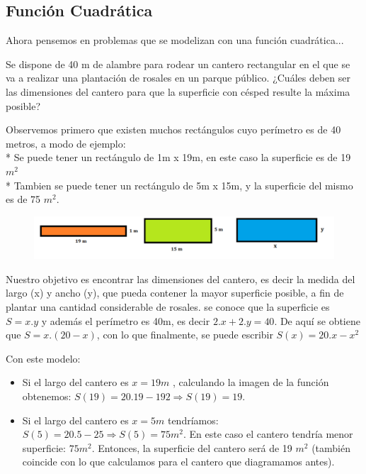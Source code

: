 \documentclass[a4paper,10pt,BCOR10mm,oneside,headsepline]{scrbook}
\begin{document}













\subsection{Función Cuadrática}

Ahora pensemos en problemas que se modelizan con una función cuadrática...

Se dispone de 40 m de alambre para rodear un cantero rectangular en el que se va a realizar una plantación de rosales en un parque público. ¿Cuáles deben ser las dimensiones del cantero para que la superficie con césped resulte la máxima posible?

Observemos primero que existen muchos rectángulos cuyo perímetro es de 40 metros, a modo de ejemplo:\\
* Se puede tener un rectángulo de 1m x 19m, en este caso la superficie es de 19 $m^{2}$\\
* Tambien se puede tener un rectángulo de 5m x 15m, y la superficie del mismo es de 75 $m^{2}$.

\begin{figure}[h!]
\centering
	\includegraphics[width=0.90\linewidth]{rectangulos.png}
\end{figure}

Nuestro objetivo es encontrar las dimensiones del cantero, es decir la medida del largo (x) y ancho (y), que pueda contener la mayor superficie posible, a fin de plantar una cantidad considerable de rosales.
se conoce que la superficie es $S = x.y$ y además el perímetro es 40m, es decir $2.x + 2.y=40 $. De aquí se obtiene que $S= x.(20-x)$, con lo que finalmente, se puede escribir $S(x) = 20.x-x^{2}$

Con este modelo: 
\begin{itemize}
	\item Si el largo del cantero es $x = 19m$ , calculando la imagen de la función obtenemos: $S(19) = 20.19 - 192 \Rightarrow 
	S(19) = 19$.\\
	\item Si el largo del cantero es $x = 5m$ tendríamos:
	$S (5) =  20.5 - 25 \Rightarrow S (5) = 75m^{2}$.
	En este caso el cantero tendría menor superficie: $75 m^{2}$.
	Entonces, la superficie del cantero será de 19 $m^{2}$ (también coincide con lo que calculamos para el cantero que diagramamos antes).
\end{itemize}
\end{document}

